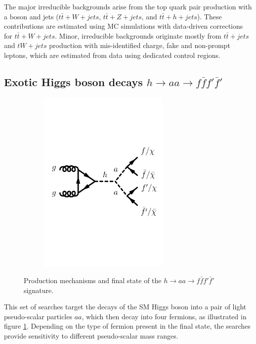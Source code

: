 The major irreducible backgrounds arise from the top quark pair production with a boson and jets ($t\bar{t}+W+jets$, $t\bar{t}+Z+jets$, and $t\bar{t}+h+jets$). These contributions are estimated using MC simulations with data-driven corrections for $t\bar{t}+W+jets$. Minor, irreducible backgrounds originate mostly from $t\bar{t}+jets$ and $tW+jets$ production with mis-identified charge, fake and non-prompt leptons, which are estimated from data using dedicated control regions.

\subsection{Exotic Higgs boson decays \texorpdfstring{$h\rightarrow aa\rightarrow f\bar{f}f'\bar{f}'$}{TEXT}}

\begin{figure}[h!]
    \centering
    \begin{subfigure}[3]{0.48\textwidth}
        \centering
        \includegraphics[width=0.7\textwidth]{figures/fig_01g.pdf}
    \end{subfigure}
    \caption{Production mechanisms and final state of the $h\rightarrow aa\rightarrow f\bar{f}f'\bar{f}'$ signature.}
    \label{fig:haaff-signature}
\end{figure} 

This set of searches target the decays of the SM Higgs boson into a pair of light pseudo-scalar particles $aa$, which then decay into four fermions, as illustrated in figure \ref{fig:haaff-signature}. Depending on the type of fermion present in the final state, the searches provide sensitivity to different pseudo-scalar mass ranges.

